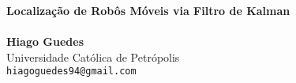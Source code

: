 \documentclass[a0,portrait]{a0poster}
\begin{document}


\begin{minipage}[b]{0.75\linewidth}
\veryHuge \color{NavyBlue} \textbf{Localização de Robôs Móveis via Filtro de Kalman} \color{Black}\\\\ %
\huge \textbf{Hiago Guedes}\\[0.5cm] %
\huge Universidade Católica de Petrópolis\\[0.4cm] %
\Large \texttt{hiagoguedes94@gmail.com}\\
\end{minipage}
%
\begin{minipage}[b]{0.25\linewidth}
\end{minipage}

\vspace{1cm} %

\end{document}
